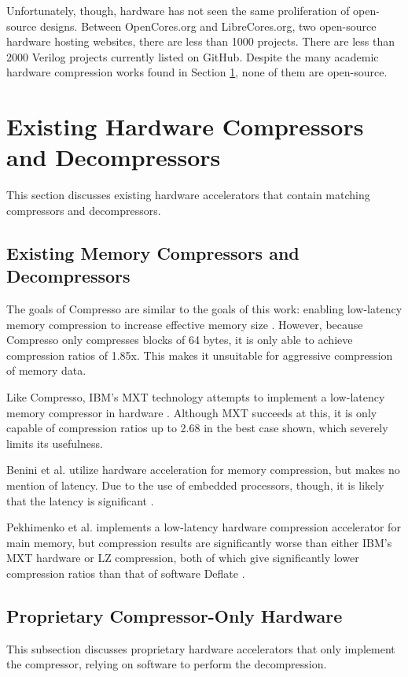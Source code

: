 \documentclass[doublespace,nopageskip]{VTthesis}
\begin{document}
Unfortunately, though, hardware has not seen the same proliferation of open-source designs. Between OpenCores.org and LibreCores.org, two open-source hardware hosting websites, there are less than 1000 projects. There are less than 2000 Verilog projects currently listed on GitHub. Despite the many academic hardware compression works found in Section \ref{se:existing_hardware_compressors_and_decompressors}, none of them are open-source.

\section{Existing Hardware Compressors and Decompressors}\label{se:existing_hardware_compressors_and_decompressors}
This section discusses existing hardware accelerators that contain matching compressors and decompressors.

\subsection{Existing Memory Compressors and Decompressors}\label{ss:other_memory_compressors_and_decompressors}
The goals of Compresso are similar to the goals of this work: enabling low-latency memory compression to increase effective memory size \cite{compresso}. However, because Compresso only compresses blocks of 64 bytes, it is only able to achieve compression ratios of 1.85x. This makes it unsuitable for aggressive compression of memory data.

Like Compresso, IBM's MXT technology attempts to implement a low-latency memory compressor in hardware \cite{mxt}. Although MXT succeeds at this, it is only capable of compression ratios up to 2.68 in the best case shown, which severely limits its usefulness.

Benini et al. utilize hardware acceleration for memory compression, but makes no mention of latency. Due to the use of embedded processors, though, it is likely that the latency is significant \cite{memorycompressionenergy}.

Pekhimenko et al. implements a low-latency hardware compression accelerator for main memory, but compression results are significantly worse than either IBM's MXT hardware or LZ compression, both of which give significantly lower compression ratios than that of software Deflate \cite{linearcompression}.

\subsection{Proprietary Compressor-Only Hardware}\label{proprietary_compressor-only_hardware}
This subsection discusses proprietary hardware accelerators that only implement the compressor, relying on software to perform the decompression.
\end{document}
